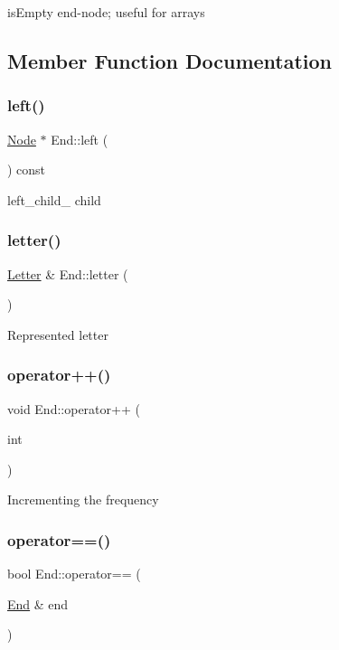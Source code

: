 is\+Empty end-\/node; useful for arrays 

\subsection{Member Function Documentation}
\mbox{\label{class_end_a812df7f23fffdb2274ca2003ebd8e884}} 
\subsubsection{\texorpdfstring{left()}{left()}}
{\footnotesize\ttfamily \hyperlink{class_node}{Node} $\ast$ End\+::left (\begin{DoxyParamCaption}{ }\end{DoxyParamCaption}) const}

left\+\_\+child\+\_\+ child \mbox{\label{class_end_a8528f92e9da9ac41a938c559b50eb174}} 
\subsubsection{\texorpdfstring{letter()}{letter()}}
{\footnotesize\ttfamily \hyperlink{class_letter}{Letter} \& End\+::letter (\begin{DoxyParamCaption}{ }\end{DoxyParamCaption})}

Represented letter \mbox{\label{class_end_aa1acae6e027fc01427b07afe58f44f09}} 
\subsubsection{\texorpdfstring{operator++()}{operator++()}}
{\footnotesize\ttfamily void End\+::operator++ (\begin{DoxyParamCaption}\item[{int}]{ }\end{DoxyParamCaption})}

Incrementing the frequency \mbox{\label{class_end_a0be5ea8a94107bb8c3a0a2eb19d8188c}} 
\subsubsection{\texorpdfstring{operator==()}{operator==()}\hspace{0.1cm}{\footnotesize\ttfamily [1/2]}}
{\footnotesize\ttfamily bool End\+::operator== (\begin{DoxyParamCaption}\item[{\hyperlink{class_end}{End} \&}]{end }\end{DoxyParamCaption})}

